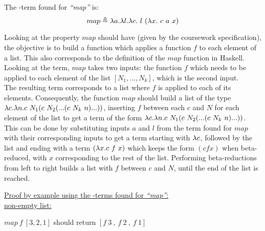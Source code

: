 \documentclass{article}
\begin{document}
\begin{Large}
		The \lamb -term found for \textit{``map''} is:
		\begin{equation*}
			map \triangleq \la a.\la l.\la c. \ l \ (\la x.\ c \ a \ x)
		\end{equation*}
		\newline
		
		Looking at the property $map$ should have (given by the coursework specification), the objective is to build a function which 
		applies a function $f$ to each element of a list. This also corresponds to the definition of the $map$ function in Haskell.
		Looking at the term, $map$ takes two inputs: the function $f$ which needs to be applied to each element of the list $[N_1,...,N_k]$, which is the second input.\\
		
		The resulting term corresponds to a list where $f$ is applied to each of its elements. Consequently, the function $map$ should build 
		a list of the type $\la c.\la n.c \ N_1 (c \ N_2 ( ... ( c \ N_k \ n)...))$, inserting $f$ between each $c$ and $N$ for each element of 
		the list to get a term of the form $\la c.\la n.c \ N_1 (c \ N_2 ( ... ( c \ N_k \ n)...))$.\\
		
		This can be done by substituting inputs $a$ and $l$ from the term found for $map$ with their corresponding inputs to get a term starting with $\lambda c$, 
		followed by the list and ending with a term $(\lambda x.c \ f \ x)$ which keeps the form $(c f x)$ when beta-reduced, with $x$ corresponding to the rest of the list.
		Performing beta-reductions from left to right builds a list with $f$ between $c$ and $N$, until the end of the list is reached.
		\newpage
		
		\underline{Proof by example using the \lamb -terms found for  \textit{``map''}:}\\
		
		\underline{non-empty list:}
		\newline
		
		$map \ f \ [3,2,1]$ should return $ [f \ 3 \ , \ f \ 2 \ , \  f \ 1]$
		

\end{Large}
\end{document}
